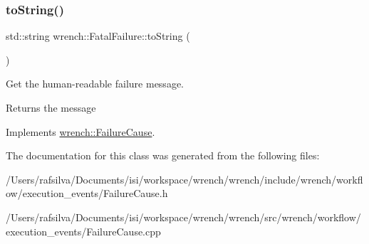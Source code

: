 \subsubsection{\texorpdfstring{to\+String()}{toString()}}
{\footnotesize\ttfamily std\+::string wrench\+::\+Fatal\+Failure\+::to\+String (\begin{DoxyParamCaption}{ }\end{DoxyParamCaption})\hspace{0.3cm}{\ttfamily [virtual]}}



Get the human-\/readable failure message. 

\begin{DoxyReturn}{Returns}
the message 
\end{DoxyReturn}


Implements \hyperlink{classwrench_1_1_failure_cause_afbad248ebe902409f2cd4f1d6f2b867d}{wrench\+::\+Failure\+Cause}.



The documentation for this class was generated from the following files\+:\begin{DoxyCompactItemize}
\item 
/\+Users/rafsilva/\+Documents/isi/workspace/wrench/wrench/include/wrench/workflow/execution\+\_\+events/Failure\+Cause.\+h\item 
/\+Users/rafsilva/\+Documents/isi/workspace/wrench/wrench/src/wrench/workflow/execution\+\_\+events/Failure\+Cause.\+cpp\end{DoxyCompactItemize}
